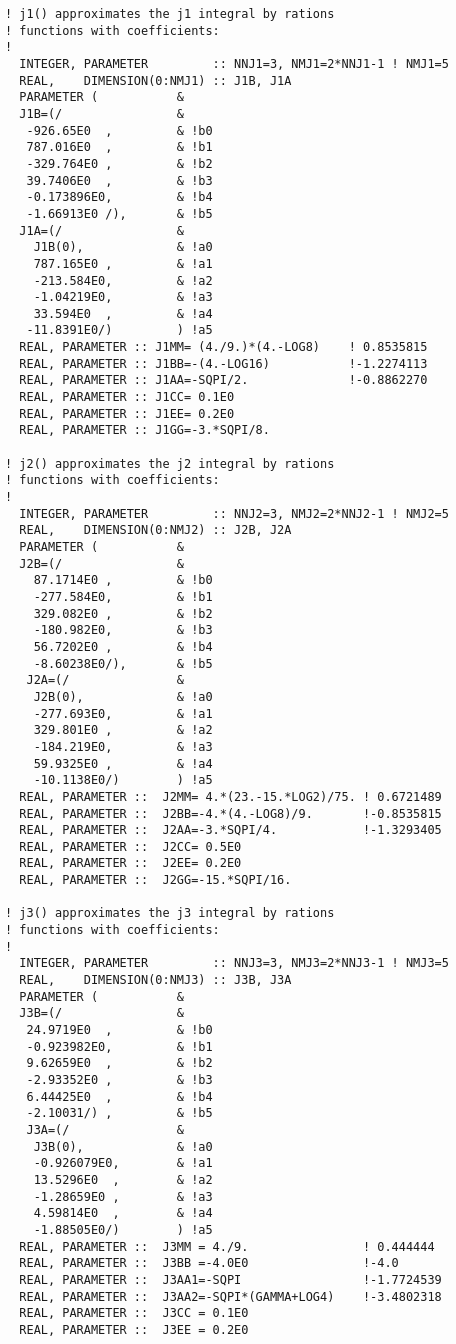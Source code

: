 \documentclass[preprint,12pt,eqsecnum,nofootinbib,amsmath,amssymb]{revtex4}
\begin{document}
{\begin{verbatim}
! j1() approximates the j1 integral by rations
! functions with coefficients:
!
  INTEGER, PARAMETER         :: NNJ1=3, NMJ1=2*NNJ1-1 ! NMJ1=5
  REAL,    DIMENSION(0:NMJ1) :: J1B, J1A
  PARAMETER (           &
  J1B=(/                &
   -926.65E0  ,         & !b0
   787.016E0  ,         & !b1
   -329.764E0 ,         & !b2
   39.7406E0  ,         & !b3
   -0.173896E0,         & !b4
   -1.66913E0 /),       & !b5
  J1A=(/                &
    J1B(0),             & !a0
    787.165E0 ,         & !a1
    -213.584E0,         & !a2
    -1.04219E0,         & !a3
    33.594E0  ,         & !a4
   -11.8391E0/)         ) !a5
  REAL, PARAMETER :: J1MM= (4./9.)*(4.-LOG8)    ! 0.8535815 
  REAL, PARAMETER :: J1BB=-(4.-LOG16)           !-1.2274113
  REAL, PARAMETER :: J1AA=-SQPI/2.              !-0.8862270
  REAL, PARAMETER :: J1CC= 0.1E0
  REAL, PARAMETER :: J1EE= 0.2E0
  REAL, PARAMETER :: J1GG=-3.*SQPI/8.

! j2() approximates the j2 integral by rations
! functions with coefficients:
!
  INTEGER, PARAMETER         :: NNJ2=3, NMJ2=2*NNJ2-1 ! NMJ2=5
  REAL,    DIMENSION(0:NMJ2) :: J2B, J2A
  PARAMETER (           &
  J2B=(/                &
    87.1714E0 ,         & !b0
    -277.584E0,         & !b1
    329.082E0 ,         & !b2
    -180.982E0,         & !b3
    56.7202E0 ,         & !b4
    -8.60238E0/),       & !b5
   J2A=(/               & 
    J2B(0),             & !a0
    -277.693E0,         & !a1
    329.801E0 ,         & !a2
    -184.219E0,         & !a3
    59.9325E0 ,         & !a4
    -10.1138E0/)        ) !a5
  REAL, PARAMETER ::  J2MM= 4.*(23.-15.*LOG2)/75. ! 0.6721489
  REAL, PARAMETER ::  J2BB=-4.*(4.-LOG8)/9.       !-0.8535815
  REAL, PARAMETER ::  J2AA=-3.*SQPI/4.            !-1.3293405 
  REAL, PARAMETER ::  J2CC= 0.5E0
  REAL, PARAMETER ::  J2EE= 0.2E0
  REAL, PARAMETER ::  J2GG=-15.*SQPI/16.

! j3() approximates the j3 integral by rations
! functions with coefficients:
!
  INTEGER, PARAMETER         :: NNJ3=3, NMJ3=2*NNJ3-1 ! NMJ3=5
  REAL,    DIMENSION(0:NMJ3) :: J3B, J3A
  PARAMETER (           &
  J3B=(/                &
   24.9719E0  ,         & !b0
   -0.923982E0,         & !b1
   9.62659E0  ,         & !b2
   -2.93352E0 ,         & !b3
   6.44425E0  ,         & !b4
   -2.10031/) ,         & !b5
   J3A=(/               &
    J3B(0),             & !a0
    -0.926079E0,        & !a1
    13.5296E0  ,        & !a2
    -1.28659E0 ,        & !a3
    4.59814E0  ,        & !a4
    -1.88505E0/)        ) !a5
  REAL, PARAMETER ::  J3MM = 4./9.                ! 0.444444 
  REAL, PARAMETER ::  J3BB =-4.0E0                !-4.0       
  REAL, PARAMETER ::  J3AA1=-SQPI                 !-1.7724539 
  REAL, PARAMETER ::  J3AA2=-SQPI*(GAMMA+LOG4)    !-3.4802318 
  REAL, PARAMETER ::  J3CC = 0.1E0 
  REAL, PARAMETER ::  J3EE = 0.2E0 


\end{verbatim}}
\end{document}
